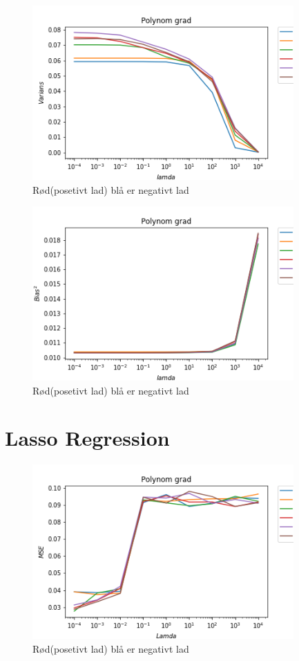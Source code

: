 \documentclass[norsk,a4paper,12pt]{article}
\begin{document}
\begin{figure}[H]
\includegraphics[width=100mm]{var(R)}
\caption{Rød(posetivt lad)  blå er negativt lad  }
\end{figure}

\begin{figure}[H]
\includegraphics[width=100mm]{Bias(R)}
\caption{Rød(posetivt lad)  blå er negativt lad  }
\end{figure}

\section*{Lasso Regression}


\begin{figure}[H]
\includegraphics[width=100mm]{MSE(L)}
\caption{Rød(posetivt lad)  blå er negativt lad  }
\end{figure}
\end{document}
